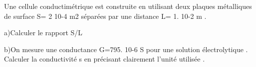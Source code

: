 Une cellule conductimétrique est construite en utilisant deux plaques métalliques de surface S= 2 10-4 m2 séparées par une distance L= 1. 10-2 m .

a)Calculer le rapport S/L

b)On mesure une conductance G=795. 10-6 S pour une solution électrolytique . Calculer la conductivité s en précisant clairement l'unité utilisée .
